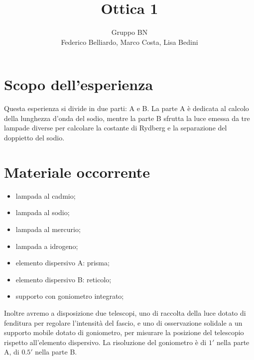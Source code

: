 \documentclass[10pt,a4paper]{article}
\author{Gruppo BN \\ Federico Belliardo, Marco Costa, Lisa Bedini}
\title{Ottica 1}
\begin{document}
\maketitle
\section{Scopo dell'esperienza}
Questa esperienza si divide in due parti: A e B.
La parte A è dedicata al calcolo della lunghezza d'onda del sodio, mentre la parte B sfrutta la luce emessa da tre lampade diverse per calcolare la costante di Rydberg e la separazione del doppietto del sodio.\\

\section{Materiale occorrente}
\begin{itemize}
\item lampada al cadmio;
\item lampada al sodio;
\item lampada al mercurio;
\item lampada a idrogeno;
\item elemento dispersivo A: prisma;
\item elemento dispersivo B: reticolo;
\item supporto con goniometro integrato;
\end{itemize}
Inoltre avremo a disposizione due telescopi, uno di raccolta della luce dotato di fenditura per regolare l'intensità del fascio, e uno di osservazione solidale a un supporto mobile dotato di goniometro, per misurare la posizione del telescopio rispetto all'elemento dispersivo.
La risoluzione del goniometro è di $1'$ nella parte A, di $0.5'$ nella parte B.\\
\end{document}
